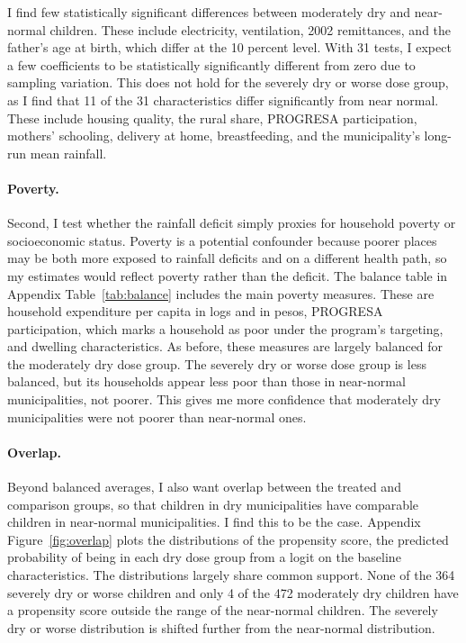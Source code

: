 I find few statistically significant differences between moderately dry and near-normal children. These include electricity, ventilation, 2002 remittances, and the father's age at birth, which differ at the 10 percent level. With 31 tests, I expect a few coefficients to be statistically significantly different from zero due to sampling variation. This does not hold for the severely dry or worse dose group, as I find that 11 of the 31 characteristics differ significantly from near normal. These include housing quality, the rural share, PROGRESA participation, mothers' schooling, delivery at home, breastfeeding, and the municipality's long-run mean rainfall.

\paragraph{Poverty.} Second, I test whether the rainfall deficit simply proxies for household poverty or socioeconomic status. Poverty is a potential confounder because poorer places may be both more exposed to rainfall deficits and on a different health path, so my estimates would reflect poverty rather than the deficit. The balance table in Appendix Table~\ref{tab:balance} includes the main poverty measures. These are household expenditure per capita in logs and in pesos, PROGRESA participation, which marks a household as poor under the program's targeting, and dwelling characteristics. As before, these measures are largely balanced for the moderately dry dose group. The severely dry or worse dose group is less balanced, but its households appear less poor than those in near-normal municipalities, not poorer. This gives me more confidence that moderately dry municipalities were not poorer than near-normal ones.

\paragraph{Overlap.} Beyond balanced averages, I also want overlap between the treated and comparison groups, so that children in dry municipalities have comparable children in near-normal municipalities. I find this to be the case. Appendix Figure~\ref{fig:overlap} plots the distributions of the propensity score, the predicted probability of being in each dry dose group from a logit on the baseline characteristics. The distributions largely share common support. None of the 364 severely dry or worse children and only 4 of the 472 moderately dry children have a propensity score outside the range of the near-normal children. The severely dry or worse distribution is shifted further from the near-normal distribution.


